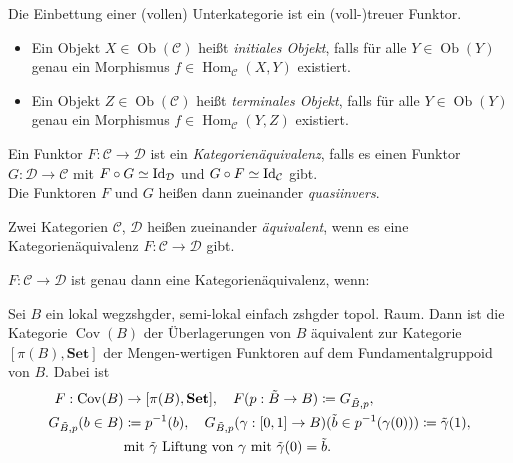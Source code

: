 \documentclass{cheat-sheet}
\newcommand{\SetC}{\mathbf{Set}} %
\DeclareMathOperator{\Hom}{Hom} %
\newcommand{\Cat}{\mathcal{C}} %
\newcommand{\Dat}{\mathcal{D}} %
\DeclareMathOperator{\Ob}{Ob} %
\DeclareMathOperator{\Cov}{Cov} %
\begin{document}
\begin{bem}
  Die Einbettung einer (vollen) Unterkategorie ist ein (voll-)treuer Funktor.
\end{bem}

\begin{defn}
  \begin{itemize}
    \item Ein Objekt $X \in \Ob(\Cat)$ heißt \emph{initiales Objekt}, falls für alle $Y \in \Ob(Y)$ genau ein Morphismus $f \in \Hom_\Cat(X, Y)$ existiert.
    \item Ein Objekt $Z \in \Ob(\Cat)$ heißt \emph{terminales Objekt}, falls für alle $Y \in \Ob(Y)$ genau ein Morphismus $f \in \Hom_\Cat(Y, Z)$ existiert.
  \end{itemize}
\end{defn}




\begin{defn}
  Ein Funktor $F : \Cat \to \Dat$ ist ein \emph{Kategorienäquivalenz}, falls es einen Funktor $G : \Dat \to \Cat$ mit $F \circ G \simeq \Id_\Dat$ und $G \circ F \simeq \Id_\Cat$ gibt. \\
  Die Funktoren $F$ und $G$ heißen dann zueinander \emph{quasiinvers}.
\end{defn}

\begin{defn}
  Zwei Kategorien $\Cat$, $\Dat$ heißen zueinander \emph{äquivalent}, wenn es eine Kategorienäquivalenz $F : \Cat \to \Dat$ gibt.
\end{defn}


\begin{prop}
  $F : \Cat \to \Dat$ ist genau dann eine Kategorienäquivalenz, wenn:
   \quad
  \inlineitem{$\fa{Y \in \Ob(\Dat)} \ex{X \in \Ob(\Cat)} Y \cong F(X)$}
\end{prop}


\begin{bsp}
  Sei $B$ ein lokal wegzshgder, semi-lokal einfach zshgder topol. Raum. Dann ist die Kategorie $\Cov(B)$ der Überlagerungen von $B$ äquivalent zur Kategorie $[\pi(B), \SetC]$ der Mengen-wertigen Funktoren auf dem Fundamentalgruppoid von $B$. Dabei ist
  \begin{align*}
    F : \Cov(B) & \to [\pi(B), \SetC], \quad F(p : \tilde{B} \to B) \coloneqq G_{\tilde{B},p}, \\
    G_{\tilde{B},p}(b \in B) & \coloneqq p^{-1}(b), \quad G_{\tilde{B},p}(\gamma : \I \to B)(\tilde{b} \in p^{-1}(\gamma(0))) \coloneqq \tilde{\gamma}(1), \\
    & \text{mit $\tilde{\gamma}$ Liftung von $\gamma$ mit $\tilde{\gamma}(0) = \tilde{b}$}.
  \end{align*}
\end{bsp}
\end{document}
